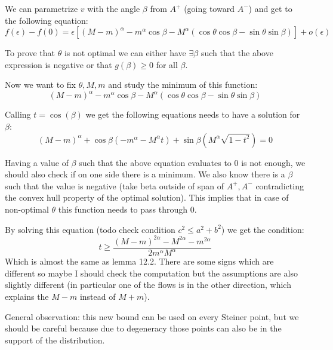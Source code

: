 \documentclass{article}
\begin{document}
    We can parametrize $v$ with the angle $\beta$ from $A^+$ (going toward $A^-$) and get to the following equation:
    \begin{equation}
        f(\epsilon) - f(0) = \epsilon \left[ (M-m)^\alpha - m^\alpha \cos\beta - M^\alpha (\cos\theta\cos\beta - \sin\theta\sin\beta) \right] + o(\epsilon)
    \end{equation}

    To prove that $\theta$ is not optimal we can either have $\exists \beta$ such that the above expression is negative or
    that $g(\beta) \ge 0$ for all $\beta$.

    Now we want to fix $\theta, M, m$ and study the minimum of this function:
    \begin{equation}
    (M-m)
        ^\alpha - m^\alpha \cos\beta - M^\alpha (\cos\theta\cos\beta - \sin\theta\sin\beta)
    \end{equation}

    Calling $t = \cos(\beta)$ we get the following equations needs to have a solution for $\beta$:
    \begin{equation}
    (M-m)
        ^{\alpha} + \cos\beta(-m^\alpha-M^\alpha t) + \sin\beta(M^\alpha \sqrt{1-t^2}) = 0
    \end{equation}

    Having a value of $\beta$ such that the above equation evaluates to 0 is not enough, we should also check if on one side there is
    a minimum.
    We also know there is a $\beta$ such that the value is negative (take beta outside of span of $A^+, A^-$ contradicting the convex
    hull property of the optimal solution). This implies that in case of non-optimal $\theta$ this function needs to pass
    through 0.


    By solving this equation (todo check condition $c^2 \le a^2 + b^2$) we get the condition:
    \begin{equation}
        t \ge \frac{(M-m)^{2\alpha} - M^{2\alpha} - m^{2\alpha}}{2m^\alpha M^\alpha}
    \end{equation}
    Which is almost the same as lemma 12.2. There are some signs which are different so maybe I should check the computation but the
    assumptions are also slightly different (in particular one of the flows is in the other direction, which explains the $M-m$ instead
    of $M+m$).

    General observation:
    this new bound can be used on every Steiner point, but we should be careful because due to degeneracy those points
    can also be in the support of the distribution.
\end{document}
